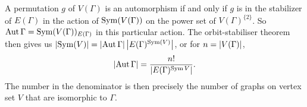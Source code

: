 \begin{remark}
  A permutation $g$ of $V(\Gamma)$ is an automorphism if and only if $g$ is in
  the stabilizer of $E(\Gamma)$ in the action of $\operatorname{Sym}(V(\Gamma))$ on the power
  set of $V(\Gamma)^{\{2\}}$.
  So $\operatorname{Aut} \Gamma = \operatorname{Sym}(V(\Gamma))_{E(\Gamma)}$ in this particular action.
  The orbit-stabiliser theorem then gives us $\left| \operatorname{Sym}(V) \right| = \left| \operatorname{Aut} \Gamma \right|
  \left| E(\Gamma)^{\operatorname{Sym}(V)} \right|$, or for $n = \left| V(\Gamma) \right|$,
  \[
	\left| \operatorname{Aut} \Gamma \right| = \frac{n!}{\left| E(\Gamma)^{\operatorname{Sym} V} \right|}.
  \]
  The number in the denominator is then precisely the number of graphs on vertex
  set $V$ that are isomorphic to $\Gamma$.
\end{remark}